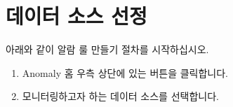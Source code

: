 \documentclass[letterpaper,10pt,english]{sphinxmanual}
\begin{document}
\section{데이터 소스 선정}
\label{\detokenize{anomaly/part02/index:select-datasource}}\label{\detokenize{anomaly/part02/index:id2}}
아래와 같이 알람 룰 만들기 절차를 시작하십시오.
\begin{enumerate}
\def\theenumi{\arabic{enumi}}
\def\labelenumi{\theenumi .}
\makeatletter\def\p@enumii{\p@enumi \theenumi .}\makeatother
\item {} 
Anomaly 홈 우측 상단에 있는  버튼을 클릭합니다.
\begin{quote}

\begin{figure}[H]
\centering

\noindent{}
\end{figure}
\end{quote}

\item {} 
모니터링하고자 하는 데이터 소스를 선택합니다.
\begin{quote}

\begin{figure}[H]
\centering

\noindent{}
\end{figure}
\end{quote}

\end{enumerate}
\end{document}
